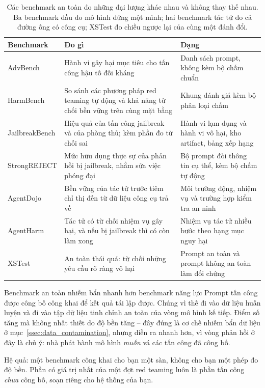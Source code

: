 \begin{table}[H]
\centering
\small
\begin{tabularx}{\textwidth}{>{\raggedright\arraybackslash}p{2.6cm} >{\raggedright\arraybackslash}X >{\raggedright\arraybackslash}p{3.5cm}}
\toprule
\textbf{Benchmark} & \textbf{Đo gì} & \textbf{Dạng} \\
\midrule
AdvBench & Hành vi gây hại mục tiêu cho tấn công hậu tố đối kháng & Danh sách prompt, không kèm bộ chấm chuẩn \\
\addlinespace
HarmBench & So sánh các phương pháp red teaming tự động và khả năng từ chối bền vững trên cùng mặt bằng & Khung đánh giá kèm bộ phân loại chấm \\
\addlinespace
JailbreakBench & Hiệu quả của tấn công jailbreak và của phòng thủ; kèm phần đo từ chối sai & Hành vi lạm dụng và hành vi vô hại, kho artifact, bảng xếp hạng \\
\addlinespace
StrongREJECT & Mức hữu dụng thực sự của phản hồi bị jailbreak, nhằm sửa việc phóng đại & Bộ prompt đòi thông tin cụ thể, kèm bộ chấm tự động \\
\addlinespace
AgentDojo & Bền vững của tác tử trước tiêm chỉ thị đến từ dữ liệu công cụ trả về & Môi trường động, nhiệm vụ và trường hợp kiểm tra an ninh \\
\addlinespace
AgentHarm & Tác tử có từ chối nhiệm vụ gây hại, và nếu bị jailbreak thì có còn làm xong & Nhiệm vụ tác tử nhiều bước theo hạng mục nguy hại \\
\addlinespace
XSTest & An toàn thái quá: từ chối những yêu cầu rõ ràng vô hại & Prompt an toàn và prompt không an toàn làm đối chứng \\
\bottomrule
\end{tabularx}
\caption{Các benchmark an toàn đo những đại lượng khác nhau và không thay thế nhau. Ba benchmark đầu đo mô hình đứng một mình; hai benchmark tác tử đo cả đường ống có công cụ; XSTest đo chiều ngược lại của cùng một đánh đổi.}
\label{tab:safety_benchmarks}
\end{table}

\begin{pitfall}{Benchmark an toàn nhiễm bẩn nhanh hơn benchmark năng lực}
Prompt tấn công được công bố công khai để kết quả tái lập được. Chúng vì thế đi vào dữ liệu huấn luyện và đi vào tập dữ liệu tinh chỉnh an toàn của vòng mô hình kế tiếp. Điểm số tăng mà không nhất thiết do độ bền tăng -- đây đúng là cơ chế nhiễm bẩn dữ liệu ở mục~\ref{ssec:data_contamination}, nhưng diễn ra nhanh hơn, vì vòng phản hồi ở đây là chủ ý: nhà phát hành mô hình \emph{muốn} vá các tấn công đã công bố.

Hệ quả: một benchmark công khai cho bạn một sàn, không cho bạn một phép đo độ bền. Phần có giá trị nhất của một đợt red teaming luôn là phần tấn công \emph{chưa} công bố, soạn riêng cho hệ thống của bạn.
\end{pitfall}

